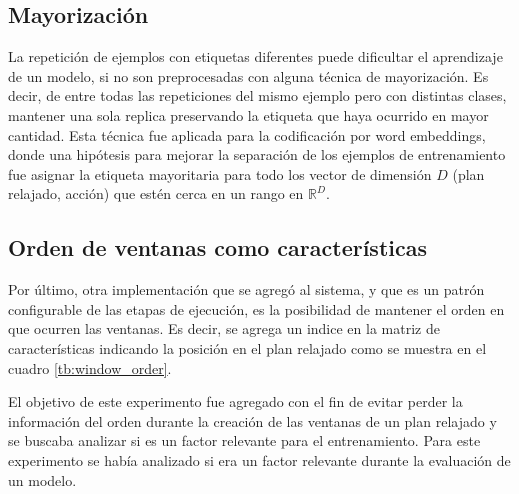 \subsection{Mayorización}

La repetición de ejemplos con etiquetas diferentes puede dificultar el
aprendizaje de un modelo, si no son preprocesadas con alguna técnica de
mayorización. Es decir, de entre todas las repeticiones del mismo ejemplo pero
con distintas clases, mantener una sola replica preservando la etiqueta que haya
ocurrido en mayor cantidad. Esta técnica fue aplicada para la codificación por
word embeddings, donde una hipótesis para mejorar la separación de los ejemplos
de entrenamiento fue asignar la etiqueta mayoritaria para todo los vector de
dimensión $D$ (plan relajado, acción) que estén cerca en un rango en
$\mathbb{R}^{D}$.

\subsection{Orden de ventanas como características}

Por último, otra implementación que se agregó al sistema, y que es un patrón
configurable de las etapas de ejecución, es la posibilidad de mantener el orden
en que ocurren las ventanas. Es decir, se agrega un indice en la matriz de
características indicando la posición en el plan relajado como se muestra en el
cuadro \ref{tb:window_order}.

\begin{table}[h!]
\centering
{}
 \caption{Ejemplos etiquetados a partir de un plan relajado y una acción}
 \label{tb:window_order}
\end{table}

El objetivo de este experimento fue agregado con el fin de evitar perder la
información del orden durante la creación de las ventanas de un plan relajado y
se buscaba analizar si es un factor relevante para el entrenamiento. Para este
experimento se había analizado si era un factor relevante durante la evaluación
de un modelo.